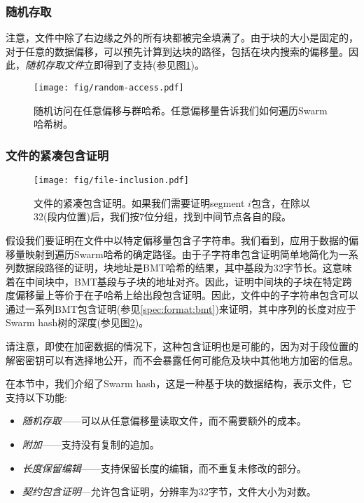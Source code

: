 \subsubsection{随机存取}

注意，文件中除了右边缘之外的所有块都被完全填满了。由于块的大小是固定的，对于任意的数据偏移，可以预先计算到达块的路径，包括在块内搜索的偏移量。因此，\emph{随机存取文件}立即得到了支持(参见图\ref{fig:random-access})。


\begin{figure}[htbp]
\centering
\texttt{[image: fig/random-access.pdf]}
\caption[随机访问在任意偏移量与群哈希\statusgreen]{随机访问在任意偏移与群哈希。任意偏移量告诉我们如何遍历Swarm哈希树。}
\label{fig:random-access}
\end{figure}

\subsubsection{文件的紧凑包含证明}


\begin{figure}[htbp]
\centering
\texttt{[image: fig/file-inclusion.pdf]}
\caption[压缩包含证明文件\statusgreen]{文件的紧凑包含证明。如果我们需要证明segment $i$包含，在除以32(段内位置)后，我们按7位分组，找到中间节点各自的段。}
\label{fig:file-inclusion}
\end{figure}


假设我们要证明在文件中以特定偏移量包含子字符串。我们看到，应用于数据的偏移量映射到遍历Swarm哈希的确定路径。由于子字符串包含证明简单地简化为一系列数据段路径的证明，块地址是BMT哈希的结果，其中基段为32字节长。这意味着在中间块中，BMT基段与子块的地址对齐。因此，证明中间块的子块在特定跨度偏移量上等价于在子哈希上给出段包含证明。因此，文件中的子字符串包含可以通过一系列BMT包含证明(参见\ref{spec:format:bmt})来证明，其中序列的长度对应于Swarm hash树的深度(参见图\ref{fig:file-inclusion})。


请注意，即使在加密数据的情况下，这种包含证明也是可能的，因为对于段位置的解密密钥可以有选择地公开，而不会暴露任何可能危及块中其他地方加密的信息。

在本节中，我们介绍了Swarm hash，这是一种基于块的数据结构，表示文件，它支持以下功能:

\begin{itemize}
    \item \emph{随机存取}——可以从任意偏移量读取文件，而不需要额外的成本。
    \item \emph{附加}——支持没有复制的追加。 
    \item \emph{长度保留编辑}——支持保留长度的编辑，而不重复未修改的部分。
    \item \emph{契约包含证明}—允许包含证明，分辨率为32字节，文件大小为对数。
\end{itemize}



